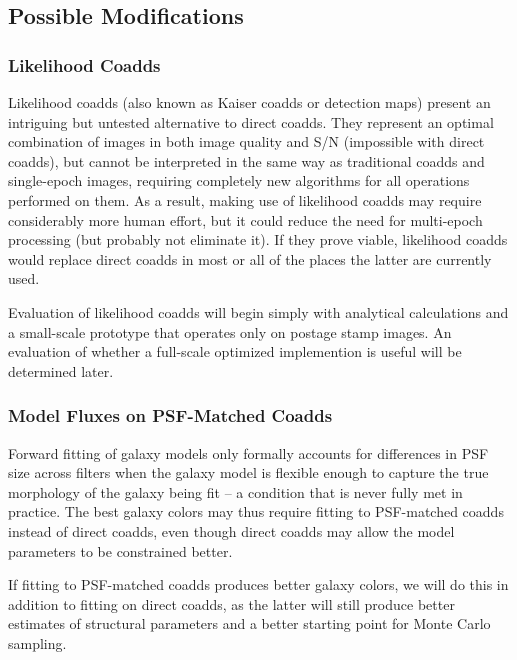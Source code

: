 \documentclass[10pt]{article}
\begin{document}
\subsection{Possible Modifications}
\label{sec:alternatives}

\subsubsection{Likelihood Coadds}

\label{sec:likelihood-coadds}

Likelihood coadds (also known as Kaiser coadds or detection maps) present an
intriguing but untested alternative to direct coadds.  They represent an
optimal combination of images in both image quality and S/N (impossible with
direct coadds), but cannot be interpreted in the same way as traditional
coadds and single-epoch images, requiring completely new algorithms for all
operations performed on them.  As a result, making use of likelihood coadds
may require considerably more human effort, but it could reduce the need for
multi-epoch processing (but probably not eliminate it). If they prove viable,
likelihood coadds would replace direct coadds in most or all of the places the
latter are currently used.

Evaluation of likelihood coadds will begin simply with analytical calculations
and a small-scale prototype that operates only on postage stamp images.  An
evaluation of whether a full-scale optimized implemention is useful will be
determined later.

\subsubsection{Model Fluxes on PSF-Matched Coadds}

\label{sec:models-on-psf-matched-coadds}

Forward fitting of galaxy models only formally accounts for differences in PSF
size across filters when the galaxy model is flexible enough to capture the
true morphology of the galaxy being fit -- a condition that is never fully
met in practice.  The best galaxy colors may thus require fitting to
PSF-matched coadds instead of direct coadds, even though direct coadds may
allow the model parameters to be constrained better.

If fitting to PSF-matched coadds produces better galaxy colors, we will do
this in addition to fitting on direct coadds, as the latter will still produce
better estimates of structural parameters and a better starting point for
Monte Carlo sampling.
\end{document}
